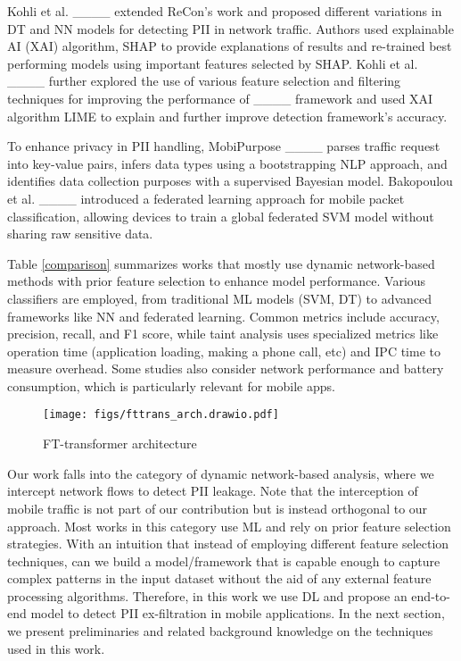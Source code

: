 Kohli et al. ____ extended ReCon's work and proposed different variations in DT and NN models for detecting PII in network traffic. Authors used explainable AI (XAI) algorithm, SHAP to provide explanations of results and re-trained best performing models using important features selected by SHAP. Kohli et al. ____ further explored the use of various feature selection and filtering techniques for improving the performance of ____ framework and used XAI algorithm LIME to explain and further improve detection framework's accuracy.

To enhance privacy in PII handling, MobiPurpose ____ parses traffic request into key-value pairs, infers data types using a bootstrapping NLP approach, and identifies data collection purposes with a supervised Bayesian model. Bakopoulou et al. ____ introduced a federated learning approach for mobile packet classification, allowing devices to train a global federated SVM model without sharing raw sensitive data. 

Table \ref{comparison} summarizes works that mostly use dynamic network-based methods with prior feature selection to enhance model performance. Various classifiers are employed, from traditional ML models (SVM, DT) to advanced frameworks like NN and federated learning. Common metrics include accuracy, precision, recall, and F1 score, while taint analysis uses specialized metrics like operation time (application loading, making a phone call, etc) and IPC time to measure overhead. Some studies also consider network performance and battery consumption, which is particularly relevant for mobile apps.
\begin{figure*}
    \centering
    \texttt{[image: figs/fttrans\_arch.drawio.pdf]}
    \caption{FT-transformer architecture}
    \label{ftransarc}
\end{figure*}

Our work falls into the category of dynamic network-based analysis, where we intercept network flows to detect PII leakage. Note that the interception of mobile traffic is not part of our contribution but is instead orthogonal to our approach. Most works in this category use ML and rely on prior feature selection strategies. With an intuition that instead of employing different feature selection techniques, can we build a model/framework that is capable enough to capture complex patterns in the input dataset without the aid of any external feature processing algorithms. Therefore, in this work we use DL and propose an end-to-end model to detect PII ex-filtration in mobile applications. In the next section, we present preliminaries and related background knowledge on the techniques used in this work.